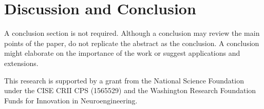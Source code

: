 \documentclass{ifacconf}
\begin{document}
\section{Discussion and Conclusion}

A conclusion section is not required. Although a conclusion may review
the main points of the paper, do not replicate the abstract as the
conclusion. A conclusion might elaborate on the importance of the work
or suggest applications and extensions.

\begin{ack}
This research is supported by a grant from the National Science Foundation under the CISE CRII CPS (1565529) and the Washington Research Foundation Funds for Innovation in Neuroengineering.
\end{ack}









\end{document}
